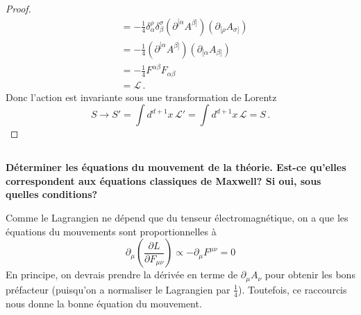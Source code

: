 \documentclass{article}
\numberwithin{equation}{section}
\theoremstyle{solution}
\newtheorem{solution}{Réponse}[section]
\begin{document}
\begin{proof}
\begin{align*}
        &= -\frac{1}{4}\delta_\alpha^{\rho}\delta_\beta^{\sigma}(\partial^{[\alpha}A^{\beta]})(\partial_{[\rho} A_{\sigma]}) \\
        &= -\frac{1}{4}(\partial^{[\alpha}A^{\beta]})(\partial_{[\alpha} A_{\beta]}) \\
        &= -\frac{1}{4}F^{\alpha\beta}F_{\alpha\beta} \\
        &= \mathcal{L}\, .
\end{align*}
Donc l'action est invariante sous une transformation de Lorentz
\begin{equation}
        S \rightarrow S' = \int d^{d+1}x\, \mathcal{L}' = \int d^{d+1}x\, \mathcal{L} = S\, .
\end{equation} 

        

\end{proof}
\subsection{}
\textbf{Déterminer les équations du mouvement de la théorie. Est-ce qu’elles correspondent aux
équations classiques de Maxwell? Si oui, sous quelles conditions?}
\vspace{2ex}

Comme le Lagrangien ne dépend que du tenseur électromagnétique, on a que les équations du mouvements sont proportionnelles à
\begin{equation}
        \partial_{\mu}\left( \frac{\partial L}{\partial F_{\mu\nu}} \right) \propto \boxed{-\partial_{\mu}F^{\mu\nu} = 0}
\end{equation} 
En principe, on devrais prendre la dérivée en terme de $\partial_{\mu}A_\nu$ pour obtenir les bons préfacteur (puisqu'on a normaliser le Lagrangien par $\frac{1}{4}$). 
Toutefois, ce raccourcis nous donne la bonne équation du mouvement.
\end{document}

